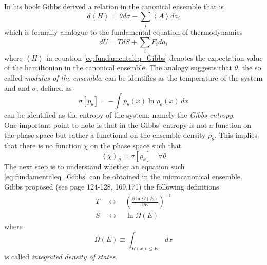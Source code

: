 In his book \cite{gibbs_2010} Gibbs derived a relation in the canonical ensemble that is
\begin{equation}
    d\left\langle H \right\rangle = \theta d\sigma - \sum_i \left\langle A \right\rangle da_i
    \label{eq:fundamentaleq_Gibbs}
\end{equation}
which is formally analogue to the fundamental equation of thermodynamics
\begin{equation*}
    dU = TdS + \sum_i F_i da_i
\end{equation*}
where $\left\langle H \right\rangle$ in equation \ref{eq:fundamentaleq_Gibbs} denotes the expectation value of the hamiltonian in the canonical ensemble.
The analogy suggests that $\theta$, the so called \emph{modulus of the ensemble}, can be identifies as the temperature of the system and  and $\sigma$, defined as
\begin{equation*}
    \sigma[p_{\theta}] = - \int p_{\theta}(x) \ln \rho_{\theta}(x) \, dx 
\end{equation*}
can be identified as the entropy of the system, namely the \emph{Gibbs entropy}. \\
One important point to note is that in the Gibbs' entropy is not a function on the phase space but rather a functional on the ensemble density $\rho_{\theta}$. This implies that there is no function $\chi$ on the phase space such that 
\begin{equation*}
    \left\langle \chi \right\rangle_{\theta} = \sigma[\rho_{\theta}] \quad \forall \theta
\end{equation*}
The next step is to understand whether an equation such \ref{eq:fundamentaleq_Gibbs} can be obtained in the microcanonical ensemble. Gibbs proposed (see \cite{gibbs_2010} page 124-128, 169,171) the following definitions
\begin{gather*}
    T \quad \longleftrightarrow \quad \left(\frac{\partial \ln \Omega(E)}{\partial E}\right)^{-1} \\
    S \quad \longleftrightarrow \quad \ln \Omega(E)
\end{gather*}
where 
\begin{equation*}
    \Omega(E) \equiv \int_{H(x) \leq E} \, dx
\end{equation*}
is called \emph{integrated density of states}. 